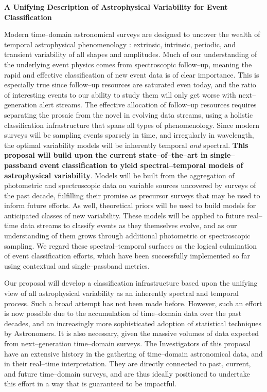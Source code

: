 \centerline{\bf A Unifying Description of Astrophysical Variability for Event
Classification} \medskip

Modern time--domain astronomical surveys are designed to uncover the wealth of
temporal astrophysical phenomenology : extrinsic, intrinsic, periodic, and
transient variability of all shapes and amplitudes.  Much of our understanding
of the underlying event physics comes from spectroscopic follow--up, meaning the
rapid and effective classification of new event data is of clear importance.
This is especially true since follow--up resources are saturated even today, and
the ratio of interesting events to our ability to study them will only get worse
with next--generation alert streams. The effective allocation of follow--up
resources requires separating the prosaic from the novel in evolving data
streams, using a holistic classification infrastructure that spans all types of
phenomenology. Since modern surveys will be sampling events sparsely in time,
and irregularly in wavelength, the optimal variability models will be inherently
temporal {\it and} spectral.  {\bf This proposal will build upon the current
state--of--the--art in single--passband event classification to yield
spectral--temporal models of astrophysical variability}.  Models will be built
from the aggregation of photometric and spectroscopic data on variable sources
uncovered by surveys of the past decade, fulfilling their promise as precursor
surveys that may be used to inform future efforts.  As well, theoretical priors
will be used to build models for anticipated classes of new variability.  These
models will be applied to future real--time data streams to classify events as
they themselves evolve, and as our understanding of them grows through
additional photometric or spectroscopic sampling.  We regard these
spectral--temporal surfaces as the logical culmination of event classification
efforts, which have been successfully implemented so far using contextual and
single--passband metrics.

\bigskip \centerline{}

Our proposal will develop a classification infrastructure based upon the
unifying view of all astrophysical variability as an inherently spectral and
temporal process.  Such a broad attempt has not been made before. However, such
an effort is now possible due to the accumulation of time--domain data over the
past decades, and an increasingly more sophisticated adoption of statistical
techniques by Astronomers. It is also necessary, given the massive volumes of
data expected from next--generation time--domain surveys. The Investigators of
this proposal have an extensive history in the gathering of time--domain
astronomical data, and in their real--time interpretation.  They are directly
connected to past, current, and future time--domain surveys, and are thus
ideally positioned to undertake this effort in a way that is guaranteed to be
impactful.

